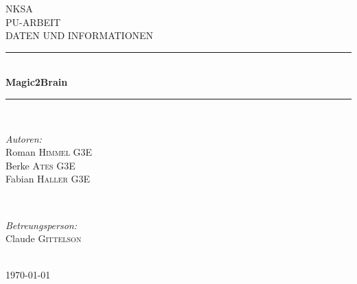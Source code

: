 



\begin{titlepage}

\newcommand{\HRule}{\rule{\linewidth}{0.5mm}} 

\center

\textsc{\LARGE NKSA}\\[1.5cm] 
\textsc{\Large PU-ARBEIT}\\[0.5cm] 
\textsc{\large DATEN UND INFORMATIONEN}\\[0.5cm] 

\HRule \\[0.4cm]
{ \huge \bfseries Magic2Brain}\\[0.4cm] 
\HRule \\[1.5cm]

\begin{minipage}{0.4\textwidth}
\begin{center}\large
\emph{Autoren:}\\
Roman \textsc{Himmel} G3E\\
Berke \textsc{Ates} G3E\\
Fabian \textsc{Haller} G3E
\end{center}
\end{minipage}
~
\begin{minipage}{0.4\textwidth}
\begin{flushright} \large
\emph{Betreungsperson:} \\
Claude \textsc{Gittelson}
\end{flushright}
\end{minipage}\\[4cm]

{\large \today}\\[3cm] 


\vfill

\end{titlepage}

\renewcommand{\contentsname}{Inhaltsverzeichnis}
\renewcommand{\refname}{Quellenverzeichnis}


